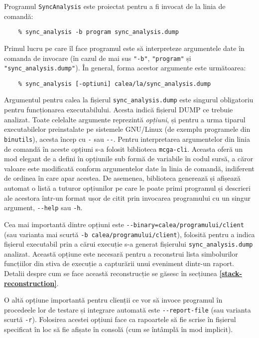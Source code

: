 Programul \lstinline{SyncAnalysis} este proiectat pentru a fi invocat de
la linia de comandă:
\begin{lstlisting}
    % sync_analysis -b program sync_analysis.dump
\end{lstlisting}
Primul lucru pe care îl face programul este să interpreteze argumentele
date în comanda de invocare (în cazul de mai sus \lstinline{"-b"},
\lstinline{"program"} și \lstinline{"sync_analysis.dump"}). În general,
forma acestor argumente este următoarea:
\begin{lstlisting}
    % sync_analysis [-optiuni] calea/la/sync_analysis.dump
\end{lstlisting}
Argumentul pentru calea la fișierul \lstinline{sync_analysis.dump} este
singurul obligatoriu pentru funcționarea executabilului. Acesta indică
fișierul DUMP ce trebuie analizat. Toate celelalte argumente reprezintă
\textit{opțiuni}, și pentru a urma tiparul executabilelor preinstalate
pe sistemele GNU/Linux (de exemplu programele din
\lstinline{binutils}\cite{binutils}), acesta încep cu \lstinline{-} sau
\lstinline{--}. Pentru interpretarea argumentelor din linia de comandă
în aceste opțiuni s-a folosit biblioteca
\lstinline{mcga-cli}\cite{mcga-cli}. Aceasta oferă un mod elegant de a
defini în opțiunile sub formă de variabile în codul sursă, a căror
valoare este modificată conform argumentelor date în linia de comandă,
indiferent de ordinea în care apar acestea. De asemenea, biblioteca
generează și afișează automat o listă a tuturor opțiunilor pe care le
poate primi programul și descrieri ale acestora într-un format ușor de
citit prin invocarea programului cu un singur argument,
\lstinline{--help} sau \lstinline{-h}.

Cea mai importantă dintre opțiuni este
\lstinline{--binary=calea/programului/client} (sau varianta mai
scurtă \lstinline{-b calea/programului/client}), folosită pentru a
indica fișierul executabil prin a cărui execuție s-a generat fișierului
\lstinline{sync_analysis.dump} analizat. Această opțiune este necesară
pentru a reconstrui lista simbolurilor funcțiilor din stiva de execuție
a capturării unui eveniment dintr-un raport. Detalii despre cum se face
această reconstrucție se găsesc în secțiunea
\textbf{\ref{stack-reconstruction}}.

O altă opțiune importantă pentru clienții ce vor să invoce programul în
procedeele lor de testare și integrare automată este
\lstinline{--report-file} (sau varianta scurtă \lstinline{-r}).
Folosirea acestei opțiuni face ca rapoartele să fie scrise în fișierul
specificat în loc să fie afișate în consolă (cum se întâmplă în mod
implicit).

